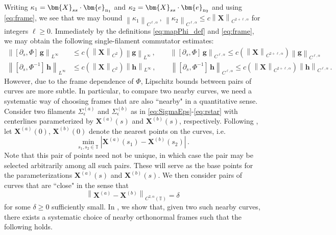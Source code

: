 \documentclass[11pt,reqno]{amsart}
\newcommand{\T}{\mathbb{T}}
\newcommand{\X}{\bm{X}}
\newcommand{\be}{\bm{e}}
\newcommand{\p}{\partial}
\newcommand{\abs}[1]{\left\lvert #1 \right\rvert}
\newcommand{\norm}[1]{\left\lVert #1 \right\rVert}
\theoremstyle{definition}
\begin{document}
Writing $\kappa_1=\X_{ss}\cdot\be_{\rm n_1}$ and $\kappa_2=\X_{ss}\cdot\be_{\rm n_2}$ and using \eqref{eq:frame}, we see that we may bound $\norm{\kappa_1}_{C^{\ell,\alpha}}\,,\,\norm{\kappa_2}_{C^{\ell,\alpha}}\le c\norm{\X}_{C^{2+\ell,\alpha}}$ for integers $\ell \ge 0$.
Immediately by the definitions \eqref{eq:mapPhi_def} and \eqref{eq:frame}, we may obtain the following single-filament commutator estimates: 
\begin{equation}\label{eq:Phi_commutator_est}
\begin{aligned}
\norm{[\p_s,\Phi]\,\bm{g}}_{L^\infty} &\le c(\norm{\X}_{C^2})\norm{\bm{g}}_{L^\infty}\,, \qquad 
\norm{[\p_s,\Phi]\,\bm{g}}_{C^{\ell,\alpha}} \le c(\norm{\X}_{C^{2+\ell,\alpha}})\norm{\bm{g}}_{C^{\ell,\alpha}} \\
%
\norm{[\p_s,\Phi^{-1}]\,\bm{h}}_{L^\infty}&\le c(\norm{\X}_{C^2})\norm{\bm{h}}_{L^\infty}\,, \qquad 
\norm{[\p_s,\Phi^{-1}]\,\bm{h}}_{C^{\ell,\alpha}} \le c(\norm{\X}_{C^{2+\ell,\alpha}})\norm{\bm{h}}_{C^{\ell,\alpha}}\,.
\end{aligned}
\end{equation}
%
%
%
However, due to the frame dependence of $\Phi$, Lipschitz bounds between pairs of curves are more subtle. In particular, to compare two nearby curves, we need a systematic way of choosing frames that are also ``nearby" in a quantitative sense. 
Consider two filaments $\Sigma_\epsilon^{(a)}$ and $\Sigma_\epsilon^{(b)}$ as in \eqref{eq:SigmaEps}-\eqref{eq:rstar} with centerlines parameterized by $\X^{(a)}(s)$ and $\X^{(b)}(s)$, respectively. Following \cite{ohm2024free}, let $\X^{(a)}(0)$, $\X^{(b)}(0)$ denote the nearest points on the curves, i.e.
\begin{equation}
\min_{s_1,s_2\in \T} \abs{\X^{(a)}(s_1)-\X^{(b)}(s_2)}\,.
\end{equation}
Note that this pair of points need not be unique, in which case the pair may be selected arbitrarily among all such pairs. These will serve as the base points for the parameterizations $\X^{(a)}(s)$ and $\X^{(b)}(s)$. We then consider pairs of curves that are ``close" in the sense that  
\begin{equation}\label{eq:XaXb_close}
\norm{\X^{(a)}-\X^{(b)}}_{C^{2,\alpha}(\T)} =\delta
\end{equation}
for some $\delta\ge 0$ sufficiently small. In \cite[Lemma 1.1]{ohm2024free}, we show that, given two such nearby curves, there exists a systematic choice of nearby orthonormal frames such that the following holds. 
%
%
\end{document}

